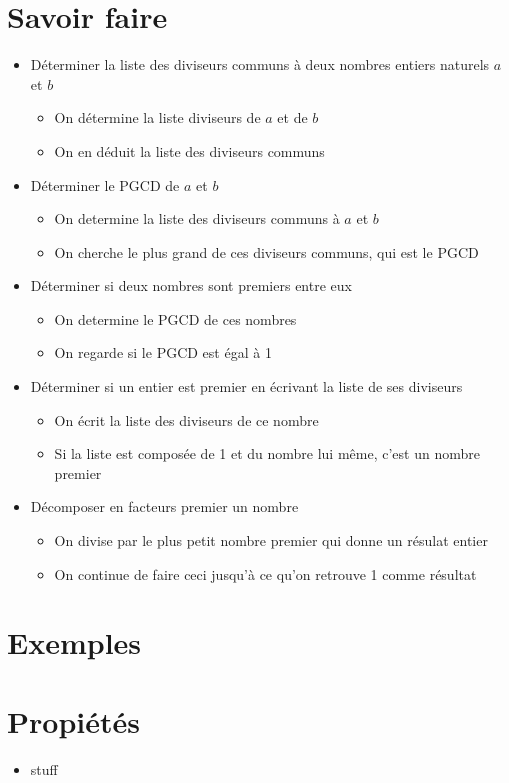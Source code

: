 \documentclass[14pt, letterpaper]{article}
\begin{document}
\section{Savoir faire}
\begin{itemize}
\item{D\'eterminer la liste des diviseurs communs \`a deux nombres entiers
    naturels \(a\) et \(b\)}
    \begin{itemize}
      \item{On d\'etermine la liste diviseurs de \(a\) et de \(b\)}
      \item{On en d\'eduit la liste des diviseurs communs}
    \end{itemize}

\item{D\'eterminer le PGCD de \(a\) et \(b\)}
    \begin{itemize}
      \item{On determine la liste des diviseurs communs \`a \(a\) et \(b\)}
      \item{On cherche le plus grand de ces diviseurs communs, qui est le PGCD}
    \end{itemize}

\item{D\'eterminer si deux nombres sont premiers entre eux}
    \begin{itemize}
      \item{On determine le PGCD de ces nombres}
      \item{On regarde si le PGCD est \'egal \`a 1}
    \end{itemize}

\item{D\'eterminer si un entier est premier en \'ecrivant la liste de ses diviseurs}
    \begin{itemize}
      \item{On \'ecrit la liste des diviseurs de ce nombre}
      \item{Si la liste est compos\'ee de 1 et du nombre lui m\^eme, c'est un
        nombre premier}
    \end{itemize}
  \item{D\'ecomposer en facteurs premier un nombre}
    \begin{itemize}
      \item{On divise par le plus petit nombre premier qui donne un r\'esulat
        entier}
        \item{On continue de faire ceci jusqu'\`a ce qu'on retrouve 1 comme r\'esultat}
    \end{itemize}

\end{itemize}
\section{Exemples}
\section{Propi\'et\'es}
\begin{itemize}
    \item{stuff}
\end{itemize}
\end{document}
